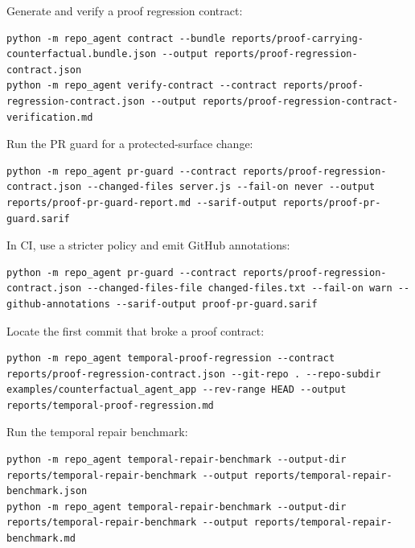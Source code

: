 \documentclass[UTF8,12pt,openany]{ctexbook}
\begin{document}
Generate and verify a proof regression contract:\par

\begin{lstlisting}
python -m repo_agent contract --bundle reports/proof-carrying-counterfactual.bundle.json --output reports/proof-regression-contract.json
python -m repo_agent verify-contract --contract reports/proof-regression-contract.json --output reports/proof-regression-contract-verification.md
\end{lstlisting}

Run the PR guard for a protected-surface change:\par

\begin{lstlisting}
python -m repo_agent pr-guard --contract reports/proof-regression-contract.json --changed-files server.js --fail-on never --output reports/proof-pr-guard-report.md --sarif-output reports/proof-pr-guard.sarif
\end{lstlisting}

In CI, use a stricter policy and emit GitHub annotations:\par

\begin{lstlisting}
python -m repo_agent pr-guard --contract reports/proof-regression-contract.json --changed-files-file changed-files.txt --fail-on warn --github-annotations --sarif-output proof-pr-guard.sarif
\end{lstlisting}

Locate the first commit that broke a proof contract:\par

\begin{lstlisting}
python -m repo_agent temporal-proof-regression --contract reports/proof-regression-contract.json --git-repo . --repo-subdir examples/counterfactual_agent_app --rev-range HEAD --output reports/temporal-proof-regression.md
\end{lstlisting}

Run the temporal repair benchmark:\par

\begin{lstlisting}
python -m repo_agent temporal-repair-benchmark --output-dir reports/temporal-repair-benchmark --output reports/temporal-repair-benchmark.json
python -m repo_agent temporal-repair-benchmark --output-dir reports/temporal-repair-benchmark --output reports/temporal-repair-benchmark.md
\end{lstlisting}
\end{document}
